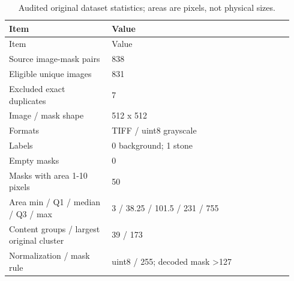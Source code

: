 \small
\begin{longtable}{p{0.34\linewidth}p{0.60\linewidth}}
\caption{Audited original dataset statistics; areas are pixels, not physical sizes.}\\
\toprule
Item & Value\\\midrule
\endfirsthead
\toprule
Item & Value\\\midrule
\endhead
Source image-mask pairs & 838\\
Eligible unique images & 831\\
Excluded exact duplicates & 7\\
Image / mask shape & 512 x 512\\
Formats & TIFF / uint8 grayscale\\
Labels & 0 background; 1 stone\\
Empty masks & 0\\
Masks with area 1-10 pixels & 50\\
Area min / Q1 / median / Q3 / max & 3 / 38.25 / 101.5 / 231 / 755\\
Content groups / largest original cluster & 39 / 173\\
Normalization / mask rule & uint8 / 255; decoded mask >127\\
\bottomrule\end{longtable}\normalsize
